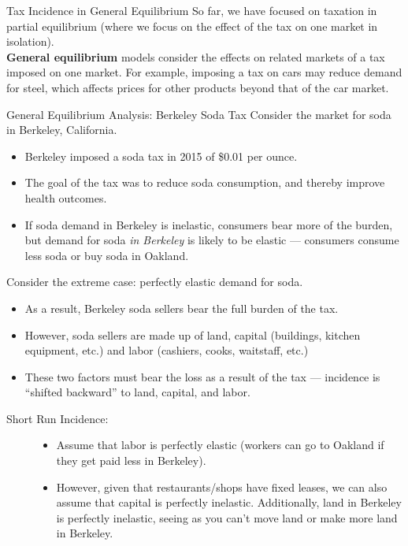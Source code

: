 \documentclass[10pt]{extarticle}
\begin{document}
  \begin{problem}{Tax Incidence in General Equilibrium}
    So far, we have focused on taxation in partial equilibrium (where we focus on the effect of the tax on one market in isolation).\\

    \textbf{General equilibrium} models consider the effects on related markets of a tax imposed on one market. For example, imposing a tax on cars may reduce demand for steel, which affects prices for other products beyond that of the car market.
  \end{problem}
  \begin{problem}{General Equilibrium Analysis: Berkeley Soda Tax}
    Consider the market for soda in Berkeley, California.
    \begin{itemize}
      \item Berkeley imposed a soda tax in 2015 of \$0.01 per ounce.
      \item The goal of the tax was to reduce soda consumption, and thereby improve health outcomes.
      \item If soda demand in Berkeley is inelastic, consumers bear more of the burden, but demand for soda \textit{in Berkeley} is likely to be elastic --- consumers consume less soda or buy soda in Oakland.
    \end{itemize}
    Consider the extreme case: perfectly elastic demand for soda.
    \begin{itemize}
      \item As a result, Berkeley soda sellers bear the full burden of the tax.
      \item However, soda sellers are made up of land, capital (buildings, kitchen equipment, etc.) and labor (cashiers, cooks, waitstaff, etc.)
      \item These two factors must bear the loss as a result of the tax --- incidence is ``shifted backward'' to land, capital, and labor.
    \end{itemize}
    \begin{description}
      \item[Short Run Incidence:]\hfill
        \begin{itemize}
          \item Assume that labor is perfectly elastic (workers can go to Oakland if they get paid less in Berkeley).
          \item However, given that restaurants/shops have fixed leases, we can also assume that capital is perfectly inelastic. Additionally, land in Berkeley is perfectly inelastic, seeing as you can't move land or make more land in Berkeley.

\end{itemize}
\end{description}
\end{problem}
\end{document}
